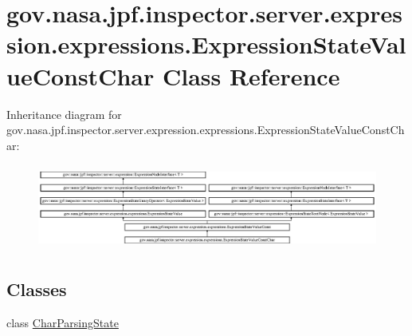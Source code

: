 \hypertarget{classgov_1_1nasa_1_1jpf_1_1inspector_1_1server_1_1expression_1_1expressions_1_1_expression_state_value_const_char}{}\section{gov.\+nasa.\+jpf.\+inspector.\+server.\+expression.\+expressions.\+Expression\+State\+Value\+Const\+Char Class Reference}
\label{classgov_1_1nasa_1_1jpf_1_1inspector_1_1server_1_1expression_1_1expressions_1_1_expression_state_value_const_char}
Inheritance diagram for gov.\+nasa.\+jpf.\+inspector.\+server.\+expression.\+expressions.\+Expression\+State\+Value\+Const\+Char\+:\begin{figure}[H]
\begin{center}
\leavevmode
\includegraphics[height=2.847458cm]{classgov_1_1nasa_1_1jpf_1_1inspector_1_1server_1_1expression_1_1expressions_1_1_expression_state_value_const_char}
\end{center}
\end{figure}
\subsection*{Classes}
\begin{DoxyCompactItemize}
\item 
class \hyperlink{classgov_1_1nasa_1_1jpf_1_1inspector_1_1server_1_1expression_1_1expressions_1_1_expression_state3e52eea711d5518799170688e70a0d37}{Char\+Parsing\+State}
\end{DoxyCompactItemize}

